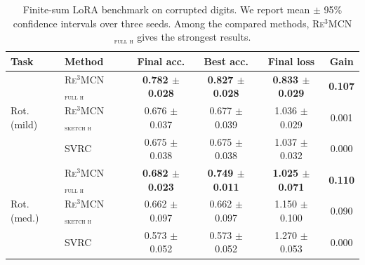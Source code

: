\documentclass{article}
\theoremstyle{plain}
\theoremstyle{definition}
\theoremstyle{remark}
\begin{document}
\begin{table}[ht!]
\centering
\small
\begin{tabular}{llcccc}
\toprule
Task & Method & Final acc. & Best acc. & Final loss & Gain \\
\midrule
\multirow{3}{*}{{Rot. (mild)}}
& \textsc{Re$^3$MCN$_{\text{full h}}$} & \textbf{0.782 $\pm$ 0.028} & \textbf{0.827 $\pm$ 0.028} & \textbf{0.833 $\pm$ 0.029} & \textbf{0.107} \\
& \textsc{Re$^3$MCN$_{\text{sketch h}}$} & 0.676 $\pm$ 0.037 & 0.677 $\pm$ 0.039 & 1.036 $\pm$ 0.029 & 0.001 \\
& \textsc{SVRC} & 0.675 $\pm$ 0.038 & 0.675 $\pm$ 0.038 & 1.037 $\pm$ 0.032 & 0.000 \\
\midrule
\multirow{3}{*}{{Rot. (med.)}}
& \textsc{Re$^3$MCN$_{\text{full h}}$} & \textbf{0.682 $\pm$ 0.023} & \textbf{0.749 $\pm$ 0.011} & \textbf{1.025 $\pm$ 0.071} & \textbf{0.110} \\
& \textsc{Re$^3$MCN$_{\text{sketch h}}$} & 0.662 $\pm$ 0.097 & 0.662 $\pm$ 0.097 & 1.150 $\pm$ 0.100 & 0.090 \\
& \textsc{SVRC} & 0.573 $\pm$ 0.052 & 0.573 $\pm$ 0.052 & 1.270 $\pm$ 0.053 & 0.000 \\
\bottomrule
\end{tabular}

\caption{Finite-sum LoRA benchmark on corrupted digits. We report mean $\pm$ 95\% confidence intervals over three seeds. Among the compared methods, \textsc{Re$^3$MCN$_{\text{full h}}$} gives the strongest results.}
\label{tab:lora_finite_main}
\end{table}
\end{document}
